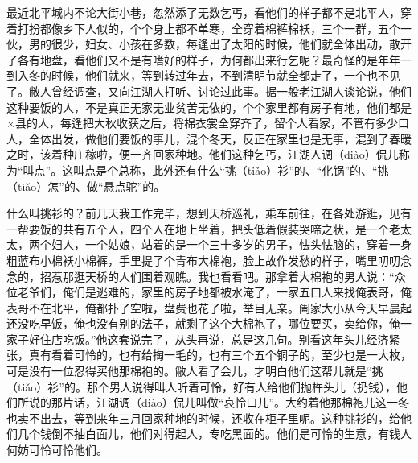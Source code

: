 \documentclass[12pt,UTF8]{ctexbook}
\begin{document}
最近北平城内不论大街小巷，忽然添了无数乞丐，看他们的样子都不是北平人，穿着打扮都像乡下人似的，个个身上都不单寒，全穿着棉裤棉袄，三个一群，五个一伙，男的很少，妇女、小孩在多数，每逢出了太阳的时候，他们就全体出动，散开了各有地盘，看他们又不是有嗜好的样子，为何都出来行乞呢？最奇怪的是年年一到入冬的时候，他们就来，等到转过年去，不到清明节就全都走了，一个也不见了。敝人曾经调查，又向江湖人打听、讨论过此事。据一般老江湖人谈论说，他们这种要饭的人，不是真正无家无业贫苦无依的，个个家里都有房子有地，他们都是×县的人，每逢把大秋收获之后，将棉衣裳全穿齐了，留个人看家，不管有多少口人，全体出发，做他们要饭的事儿，混个冬天，反正在家里也是无事，混到了春暖之时，该着种庄稼啦，便一齐回家种地。他们这种乞丐，江湖人调（diào）侃儿称为“叫点”。这叫点是个总称，此外还有什么“挑（tiǎo）衫”的、“化锅”的、“挑（tiǎo）怎”的、做“悬点驼”的。

什么叫挑衫的？前几天我工作完毕，想到天桥巡礼，乘车前往，在各处游逛，见有一帮要饭的共有五个人，四个人在地上坐着，把头低着假装哭啼之状，是一个老太太，两个妇人，一个姑娘，站着的是一个三十多岁的男子，怯头怯脑的，穿着一身粗蓝布小棉袄小棉裤，手里提了个青布大棉袍，脸上故作发愁的样子，嘴里叨叨念念的，招惹那逛天桥的人们围着观瞧。我也看看吧。那拿着大棉袍的男人说：“众位老爷们，俺们是逃难的，家里的房子地都被水淹了，一家五口人来找俺表哥，俺表哥不在北平，俺都扑了空啦，盘费也花了啦，举目无亲。阖家大小从今天早晨起还没吃早饭，俺也没有别的法子，就剩了这个大棉袍了，哪位要买，卖给你，俺一家子好住店吃饭。”他这套说完了，从头再说，总是这几句。别看这年头儿经济紧张，真有看着可怜的，也有给掏一毛的，也有三个五个铜子的，至少也是一大枚，可是没有一位忍得买他那棉袍的。敝人看了会儿，才明白他们这帮儿就是“挑（tiǎo）衫”的。那个男人说得叫人听着可怜，好有人给他们抛杵头儿（扔钱），他们所说的那片话，江湖调（diào）侃儿叫做“哀怜口儿”。大约着他那棉袍儿这一冬也卖不出去，等到来年三月回家种地的时候，还收在柜子里呢。这种挑衫的，给他们几个钱倒不抽白面儿，他们对得起人，专吃黑面的。他们是可怜的生意，有钱人何妨可怜可怜他们。
\end{document}
